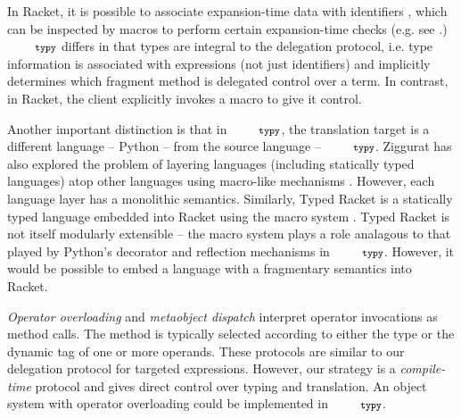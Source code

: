 \documentclass[10pt]{sigplanconf}
\newcommand{\typy}{\texttt{\footnotesize typy}}
\begin{document}
In Racket, it is possible to associate expansion-time data with identifiers \cite{DBLP:journals/jfp/FlattCDF12}, which can be inspected by macros to perform certain expansion-time checks (e.g. see \cite{Flatt:2012:CLR:2063176.2063195}.) $\typy$ differs in that types are integral to the delegation protocol, i.e. type information is associated with expressions (not just identifiers) and implicitly determines which fragment method is delegated control over a term. In contrast, in Racket, the client explicitly invokes a macro to give it control. %

Another important distinction is that in $\typy$, the translation target is a different language -- Python -- from the source language -- $\typy$. Ziggurat has also explored the problem of layering languages (including statically typed languages) atop other languages using macro-like mechanisms \cite{DBLP:journals/jfp/FisherS08}. However, each language layer has a monolithic semantics. Similarly, Typed Racket is a statically typed language embedded into Racket using the macro system \cite{TypedScheme2008,culpepper2007advanced}. Typed Racket is not itself modularly extensible -- the macro system plays a role analagous to that played by Python's decorator and reflection mechanisms in $\typy$. However, it would be possible to embed a language with a fragmentary semantics into Racket.







{\it Operator overloading} \cite{vanWijngaarden:Mailloux:Peck:Koster:Sintzoff:Lindsey:Meertens:Fisker:acta:1975} and {\it metaobject dispatch} \cite{Kiczales91} interpret operator invocations as method calls. The method is typically selected according to either the type or the dynamic tag of one or more operands. These protocols are similar to our delegation protocol for targeted expressions. However, our strategy is a {\it compile-time} protocol and gives direct control over typing and translation. An object system with  operator overloading could be implemented in $\typy$. %

\end{document}
